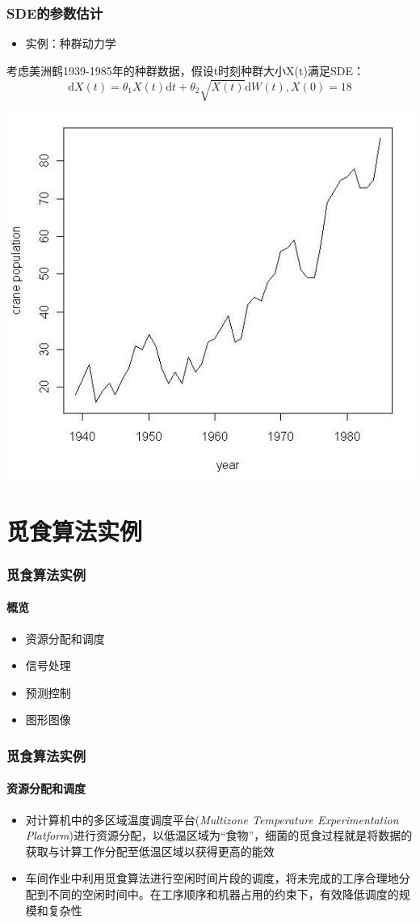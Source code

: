 \documentclass{beamer}
\begin{document}
\begin{frame}

\frametitle{SDE的参数估计}
\begin{itemize}
\item 实例：种群动力学
\end{itemize}

考虑美洲鹤1939-1985年的种群数据，假设t时刻种群大小X(t)满足SDE：$$\mathrm{d}X(t) = \theta_1X(t)\mathrm{d}t + \theta_2\sqrt{X(t)}\mathrm{d}W(t), X(0) = 18$$

\begin{center}
\includegraphics[width = .6\textwidth]{goose.png}
\end{center}

\end{frame}

%
\section{觅食算法实例}
\begin{frame}
\frametitle{觅食算法实例}
\framesubtitle{概览}
\begin{itemize}
\item 资源分配和调度
\item 信号处理
\item 预测控制
\item 图形图像
\end{itemize}
\end{frame}

\begin{frame}
\frametitle{觅食算法实例}
\framesubtitle{资源分配和调度}
\begin{itemize}
\item 对计算机中的多区域温度调度平台(\textit{Multizone Temperature Experimentation Platform})进行资源分配，以低温区域为“食物”，细菌的觅食过程就是将数据的获取与计算工作分配至低温区域以获得更高的能效
\item 车间作业中利用觅食算法进行空闲时间片段的调度，将未完成的工序合理地分配到不同的空闲时间中。在工序顺序和机器占用的约束下，有效降低调度的规模和复杂性
\end{itemize}
\end{frame}
\end{document}

